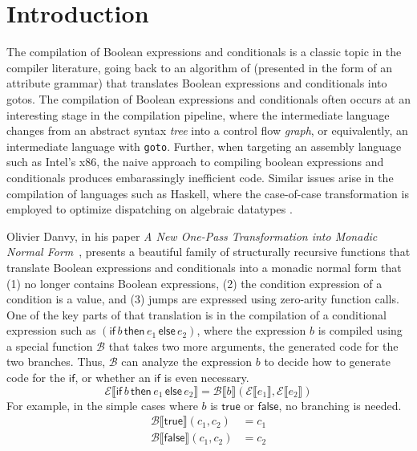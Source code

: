 \documentclass[sigplan,review,dvipsnames,screen,10pt]{acmart}
\newcommand{\TRUE}[0]{\mathsf{true}}
\newcommand{\FALSE}[0]{\mathsf{false}}
\newcommand{\IF}[3]{\mathsf{if}\,#1\,\mathsf{then}\,#2\,\mathsf{else}\,#3}
\newcommand{\CE}[1]{\mathcal{E} \llbracket #1 \rrbracket}
\newcommand{\CB}[3]{\mathcal{B} \llbracket #1 \rrbracket ( #2, #3 )}
\begin{document}

\maketitle

\section{Introduction}

The compilation of Boolean expressions and conditionals is a classic
topic in the compiler literature, going back to an algorithm of
\citet{Aho:1986qf} (presented in the form of an attribute grammar)
that translates Boolean expressions and conditionals into gotos. The
compilation of Boolean expressions and conditionals often occurs at an
interesting stage in the compilation pipeline, where the intermediate
language changes from an abstract syntax \emph{tree} into a control
flow \emph{graph}, or equivalently, an intermediate language with
\texttt{goto}. Further, when targeting an assembly language such as
Intel's x86, the naive approach to compiling boolean expressions and
conditionals produces embarassingly inefficient code. Similar issues
arise in the compilation of languages such as Haskell, where the
case-of-case transformation is employed to optimize dispatching on
algebraic datatypes \citep{PEYTONJONES19983}.

Olivier Danvy, in his paper \emph{A New One-Pass Transformation into
Monadic Normal Form}~\citep{Danvy:2003fk}, presents a beautiful family
of structurally recursive functions that translate Boolean expressions
and conditionals into a monadic normal form that (1) no longer
contains Boolean expressions, (2) the condition expression of a
condition is a value, and (3) jumps are expressed using zero-arity
function calls. One of the key parts of that translation is in the
compilation of a conditional expression such as $(\IF{b}{e_1}{e_2})$,
where the expression $b$ is compiled using a special function
$\mathcal{B}$ that takes two more arguments, the generated code for
the two branches. Thus, $\mathcal{B}$ can analyze the expression $b$
to decide how to generate code for the $\mathsf{if}$, or whether an
$\mathsf{if}$ is even necessary.
\[
\CE{\IF{b}{e_1}{e_2}} = \CB{b}{\CE{e_1}}{\CE{e_2}}
\]
For example, in the simple cases where $b$ is $\TRUE$ or $\FALSE$,
no branching is needed.
\begin{align*}
\CB{\TRUE}{c_1}{c_2} &= c_1 \\
\CB{\FALSE}{c_1}{c_2} &= c_2
\end{align*}
\end{document}
